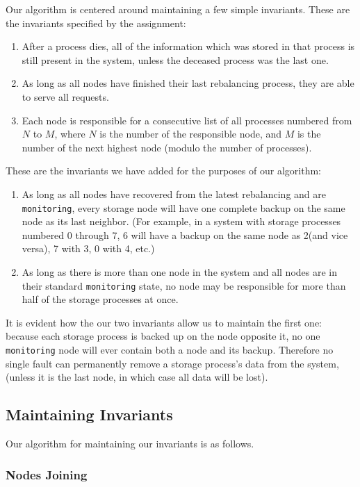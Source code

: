 \documentclass[a4paper]{article}
\begin{document}
Our algorithm is centered around maintaining a few simple invariants. These are the invariants specified by the assignment:
\begin{enumerate}
\item After a process dies, all of the information which was stored in that process is still present in the system, unless the deceased process was the last one.
\item As long as all nodes have finished their last rebalancing process, they are able to serve all requests.
\item Each node is responsible for a consecutive list of all processes numbered from $N$ to $M$, where $N$ is the number of the responsible node, and $M$ is the number of the next highest node (modulo the number of processes).
\end{enumerate}
These are the invariants we have added for the purposes of our algorithm:
\begin{enumerate}
\item As long as all nodes have recovered from the latest rebalancing and are {\tt monitoring}, every storage node will have one complete backup on the same node as its last neighbor. (For example, in a system with storage processes numbered 0 through 7, 6 will have a backup on the same node as 2(and vice versa), 7 with 3, 0 with 4, etc.)
\item As long as there is more than one node in the system and all nodes are in their standard {\tt monitoring} state, no node may be responsible for more than half of the storage processes at once.
\end{enumerate}

It is evident how the our two invariants allow us to maintain the first one: because each storage process is backed up on the node opposite it, no one {\tt monitoring} node will ever contain both a node and its backup. Therefore no single fault can permanently remove a storage process's data from the system, (unless it is the last node, in which case all data will be lost).

\subsection{Maintaining Invariants}

Our algorithm for maintaining our invariants is as follows.

\subsubsection{Nodes Joining}
\end{document}
